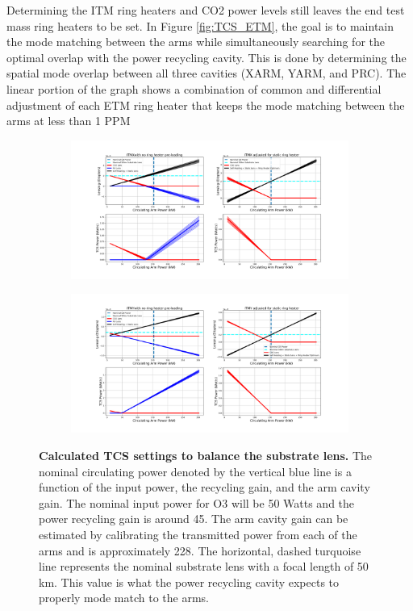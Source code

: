 	Determining the ITM ring heaters and CO2 power levels still leaves the end test mass ring heaters to be set.  In Figure \ref{fig:TCS_ETM}, the goal is to maintain the mode matching between the arms while simultaneously searching for the optimal overlap with the power recycling cavity.  This is done by determining the spatial mode overlap between all three cavities (XARM, YARM, and PRC). The linear portion of the graph shows a combination of common and differential adjustment of each ETM ring heater that keeps the mode matching between the arms at less than 1 PPM 
	
	\begin{figure}[!]
		\centering
		\begin{subfigure}[b]{1.0\textwidth}
			\centering
			\includegraphics[width=\textwidth]{../Figures/ITMX_TCS_Settings.png}
			\label{fig:TCS_ITMX}
		\end{subfigure}
		\hfill
		\begin{subfigure}[b]{1.0\textwidth}
			\centering
			\includegraphics[width=\textwidth]{../Figures/ITMY_TCS_Settings.png}
			\label{fig:TCS_ITMY}
		\end{subfigure}
		\caption[Calculated TCS settings to balance the substrate lens.]{
			\textbf{Calculated TCS settings to balance the substrate lens.}  The nominal circulating power denoted by the vertical blue line is a function of the input power, the recycling gain, and the arm cavity gain.  The nominal input power for O3 will be 50 Watts and the power recycling gain is around 45.  The arm cavity gain can be estimated by calibrating the transmitted power from each of the arms and is approximately 228.  The horizontal, dashed turquoise line represents the nominal substrate lens with a focal length of 50 km.  This value is what the power recycling cavity expects to properly mode match to the arms. 
		}
		\label{fig:TCS_ITMs}
	\end{figure}
	
